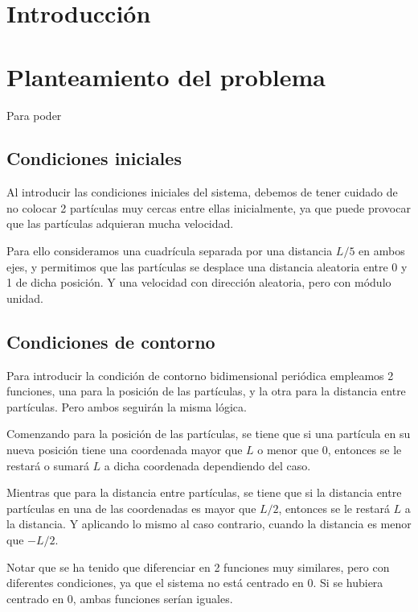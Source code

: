 \documentclass[11pt, twoside]{article} %
\begin{document}
\newpage

\setcounter{page}{0}
\tableofcontents
\newpage

\pagestyle{main}

\section{Introducción}

\section{Planteamiento del problema}

Para poder 

\subsection{Condiciones iniciales}
Al introducir las condiciones iniciales del sistema, debemos de tener cuidado de
no colocar 2 partículas muy cercas entre ellas inicialmente, ya que puede provocar
que las partículas adquieran mucha velocidad. 

Para ello consideramos una cuadrícula separada por una distancia $L/5$ en ambos 
ejes, y permitimos que las partículas se desplace una distancia aleatoria entre 0 y 1
de dicha posición. Y una velocidad con dirección aleatoria, pero con módulo unidad.

\subsection{Condiciones de contorno}

Para introducir la condición de contorno bidimensional periódica empleamos 
2 funciones, una para la posición de las partículas, y la otra para la 
distancia entre partículas. Pero ambos seguirán la misma lógica.

Comenzando para la posición de las partículas, se tiene que si una partícula en su
nueva posición tiene una coordenada mayor que $L$ o menor que 0, entonces se le 
restará o sumará $L$ a dicha coordenada dependiendo del caso. 

Mientras que para la distancia entre partículas, se tiene que si la distancia entre
partículas en una de las coordenadas es mayor que $L/2$, entonces se le restará 
$L$ a la distancia. Y aplicando lo mismo al caso contrario, cuando la distancia es
menor que $-L/2$.

Notar que se ha tenido que diferenciar en 2 funciones muy similares, pero con diferentes
condiciones, ya que el sistema no está centrado en 0. Si se hubiera centrado en 0, 
ambas funciones serían iguales.
\end{document}
